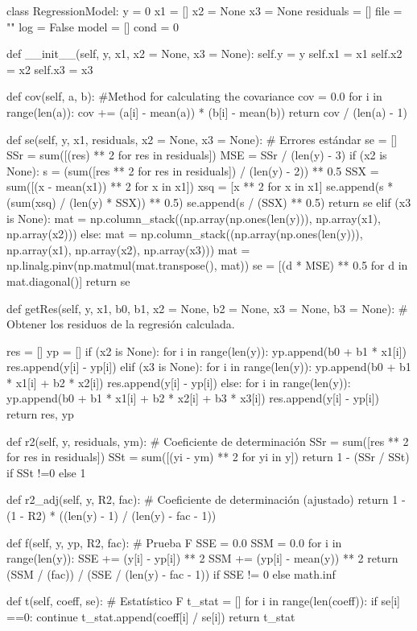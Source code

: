 \begin{pylabcode}[plotsession]
class RegressionModel:
	y = 0
	x1 = []
	x2 = None
	x3 = None
	residuals = []
	file = ""
	log = False
	model = []
	cond = 0


	def __init__(self, y, x1, x2 = None, x3 = None):
		self.y = y
		self.x1 = x1
		self.x2 = x2
		self.x3 = x3

	def cov(self, a, b): #Method for calculating the covariance
		cov = 0.0
		for i in range(len(a)):
			cov += (a[i] - mean(a)) * (b[i] - mean(b))
		return cov / (len(a) - 1)

def se(self, y, x1, residuals, x2 = None, x3 = None): # Errores estándar
	se = []
	SSr = sum([(res) ** 2 for res in residuals])
	MSE = SSr / (len(y) - 3)
	if (x2 is None):
		s = (sum([res ** 2 for res in residuals]) / (len(y) - 2)) ** 0.5
		SSX = sum([(x - mean(x1)) ** 2 for x in x1])
		xsq = [x ** 2 for x in x1]
		se.append(s * (sum(xsq) / (len(y) * SSX)) ** 0.5)
		se.append(s / (SSX) ** 0.5)
		return se
	elif (x3 is None):
		mat = np.column_stack((np.array(np.ones(len(y))), np.array(x1), np.array(x2)))
	else:
		mat = np.column_stack((np.array(np.ones(len(y))), np.array(x1), np.array(x2), np.array(x3)))
	mat = np.linalg.pinv(np.matmul(mat.transpose(), mat))
	se = [(d * MSE) ** 0.5 for d in mat.diagonal()]
	return se

	def getRes(self, y, x1, b0, b1, x2 = None, b2 = None, x3 = None, b3 = None): # Obtener los residuos de la regresión calculada.
	
		res = []
		yp = []
		if (x2 is None):
			for i in range(len(y)):
				yp.append(b0 + b1 * x1[i])
				res.append(y[i] - yp[i])
		elif (x3 is None):
			for i in range(len(y)):
				yp.append(b0 + b1 * x1[i] + b2 * x2[i])
				res.append(y[i] - yp[i])
		else:
			for i in range(len(y)):
				yp.append(b0 + b1 * x1[i] + b2 * x2[i] + b3 * x3[i])
				res.append(y[i] - yp[i])
		return res, yp

	def r2(self, y, residuals, ym): # Coeficiente de determinación
		SSr = sum([res ** 2 for res in residuals])
		SSt = sum([(yi - ym) ** 2 for yi in y])
		return 1 - (SSr / SSt) if SSt !=0 else 1

	def r2_adj(self, y, R2, fac): # Coeficiente de determinación (ajustado)
		return 1 - (1 - R2) * ((len(y) - 1) / (len(y) - fac - 1))

def f(self, y, yp, R2, fac): # Prueba F
	SSE = 0.0
	SSM = 0.0
	for i in range(len(y)):
		SSE += (y[i] - yp[i]) ** 2
		SSM += (yp[i] - mean(y)) ** 2
	return (SSM / (fac)) / (SSE / (len(y) - fac - 1)) if SSE != 0 else math.inf

	def t(self, coeff, se): # Estatístico F
		t_stat = []
		for i in range(len(coeff)):
			if se[i] ==0:
				continue
			t_stat.append(coeff[i] / se[i])
		return t_stat


\end{pylabcode}
